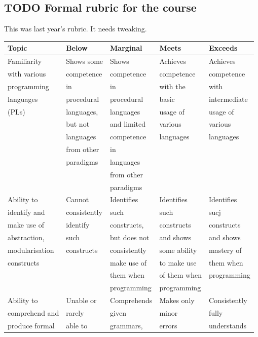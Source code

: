 \documentclass[11pt]{article}
\theoremstyle{definition}
\begin{document}
\subsection{{\bfseries\sffamily TODO} Formal rubric for the course}
\label{sec:org35f090c}
This was last year's rubric. It needs tweaking.

\begin{scriptsize}
\begin{center}
\begin{tabular}{|l|l|l|l|l|}
\hline
Topic & Below & Marginal & Meets & Exceeds \\
\hline
Familiarity & Shows some & Shows & Achieves & Achieves \\
with various & competence & competence & competence & competence \\
programming & in & in & with the & with \\
languages & procedural & procedural & basic & intermediate \\
(PLs) & languages, & languages & usage of & usage of \\
 & but not & and limited & various & various \\
 & languages & competence & languages & languages \\
 & from other & in & & \\
 & paradigms & languages & & \\
 & & from other & & \\
 & & paradigms & & \\
\hline
Ability to & Cannot & Identifies & Identifies & Identifies \\
identify and & consistently & such & such & sucj \\
make use of & identify & constructs, & constructs & constructs \\
abstraction, & such & but does not & and shows & and shows \\
modularisation & constructs & consistently & some ability & mastery of \\
constructs & & make use of & to make use & them when \\
 & & them when & of them when & programming \\
 & & programming & programming & \\
\hline
Ability to & Unable or & Comprehends & Makes only & Consistently \\
comprehend and & rarely & given & minor & fully \\
produce formal & able to & grammars, & errors & understands \\

\end{tabular}
\end{center}
\end{scriptsize}
\end{document}
